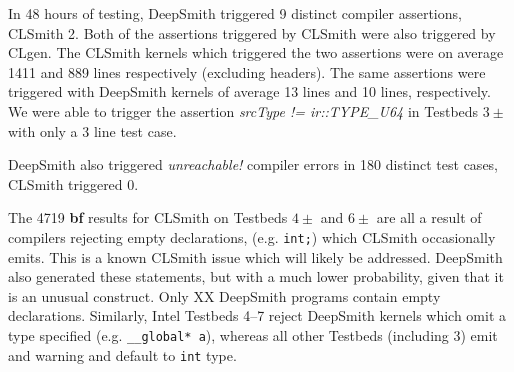 In 48 hours of testing, DeepSmith triggered 9 distinct compiler assertions, CLSmith 2. Both of the assertions triggered by CLSmith were also triggered by CLgen.
%
%
%
The CLSmith kernels which triggered the two assertions were on average 1411 and 889 lines respectively (excluding headers). The same assertions were triggered with DeepSmith kernels of average 13 lines and 10 lines, respectively. 
%
We were able to trigger the assertion \emph{srcType != ir::TYPE\_U64} in Testbeds $3\pm$ with only a 3 line test case.

DeepSmith also triggered \emph{unreachable!} compiler errors in 180 distinct test cases, CLSmith triggered 0.

The 4719 \textbf{bf} results for CLSmith on Testbeds $4\pm$ and $6\pm$ are all a result of compilers rejecting empty declarations, (e.g. \texttt{int;}) which CLSmith occasionally emits. This is a known CLSmith issue which will likely be addressed. DeepSmith also generated these statements, but with a much lower probability, given that it is an unusual construct. Only XX DeepSmith programs  contain empty declarations.
Similarly, Intel Testbeds 4--7 reject DeepSmith kernels which omit a type specified (e.g. \texttt{\_\_global* a}), whereas all other Testbeds (including 3) emit and warning and default to \texttt{int} type.


